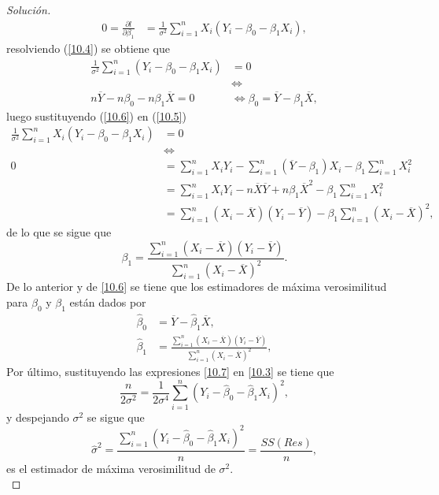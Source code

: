 \documentclass[10.5pt,notitlepage]{article}
\newenvironment{solucion}
  {\begin{proof}[Solución]}
  {\end{proof}}
\begin{document}
\begin{solucion}
\begin{align}
    0=\frac{\partial l}{\partial \beta_1} &=\frac{1}{\sigma^2}\sum_{i=1}^{n}X_i(Y_i - \beta_0 - \beta_1 X_i),\label{10.5}
\end{align}
resolviendo (\ref{10.4}) se obtiene que
\begin{align}
    \frac{1}{\sigma^2}\sum_{i=1}^{n}(Y_i - \beta_0 - \beta_1 X_i) &= 0\nonumber\\
                                                &\iff \nonumber\\
    n\overline{Y}-n\beta_0 - n\beta_1 \overline{X} = 0&\iff \beta_{0} = \overline{Y} - \beta_1\overline{X},\label{10.6} 
\end{align}
luego sustituyendo (\ref{10.6}) en (\ref{10.5})
\begin{align*}
    \frac{1}{\sigma^2}\sum_{i=1}^{n}X_i(Y_i - \beta_0 - \beta_1 X_i) &= 0\nonumber\\
                                                &\iff \nonumber\\
     0 &=\sum_{i=1}^{n}X_i Y_i - \sum_{i=1}^{n}(\overline{Y} - \beta_1)X_i - \beta_1 \sum_{i=1}^{n}X_{i}^2\nonumber\\ 
       &= \sum_{i=1}^{n}X_iY_i - n\overline{X}\overline{Y} + n\beta_1 \overline{X}^2 - \beta_1\sum_{i=1}^{n}X_{i}^2\nonumber\\ 
       &= \sum_{i=1}^{n}(X_i - \overline{X})(Y_i - \overline{Y}) - \beta_1\sum_{i=1}^{n}(X_i - \overline{X})^2, 
\end{align*}
de lo que se sigue que
\begin{equation*}
    \beta_1 = \frac{\sum_{i=1}^{n}(X_i -\overline{X})(Y_i - \overline{Y})}{\sum_{i=1}^{n}(X_i - \overline{X})^2}.
\end{equation*}
De lo anterior y de \eqref{10.6} se tiene que los estimadores de máxima verosimilitud para \(\beta_0\) y \(\beta_1\) están dados por 
\begin{align}
    \hat{\beta}_0 &= \overline{Y} - \hat{\beta}_1\overline{X},\nonumber \\
    \hat{\beta}_1 &= \frac{\sum_{i=1}^{n}(X_i -\overline{X})(Y_i - \overline{Y})}{\sum_{i=1}^{n}(X_i - \overline{X})^2}, \label{10.7}
\end{align}
Por último, sustituyendo las expresiones \eqref{10.7} en \eqref{10.3} se tiene que
\begin{equation*}
\frac{n}{2\sigma^2} =\frac{1}{2\sigma^4}\sum_{i=1}^{n}(Y_i - \hat{\beta}_0 - \hat{\beta}_1 X_i)^2,  
\end{equation*}
y despejando \(\sigma^2\) se sigue que
\begin{equation}\label{10.8}
    \hat{\sigma}^2 = \frac{\sum_{i=1}^{n}(Y_i - \hat{\beta}_0 - \hat{\beta}_1 X_i)^2}{n}=\frac{SS(Res)}{n},
\end{equation}
es el estimador de máxima verosimilitud de \(\sigma^2\). 
\\


\end{solucion}
\end{document}
